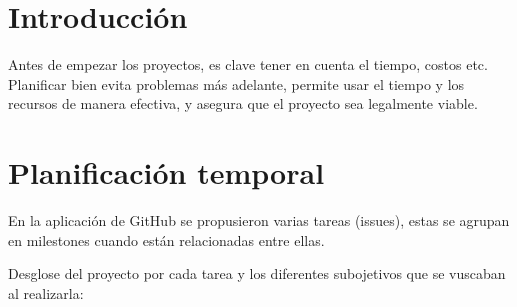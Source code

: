 
\section{Introducción}
Antes de empezar los proyectos, es clave tener en cuenta el tiempo, costos etc. Planificar bien evita problemas más adelante, permite usar el tiempo y los recursos de manera efectiva, y asegura que el proyecto sea legalmente viable.

\section{Planificación temporal}
En la aplicación de GitHub se propusieron varias tareas (issues), estas se agrupan en milestones cuando están relacionadas entre ellas. 

Desglose del proyecto por cada tarea y los diferentes subojetivos que se vuscaban al realizarla:

